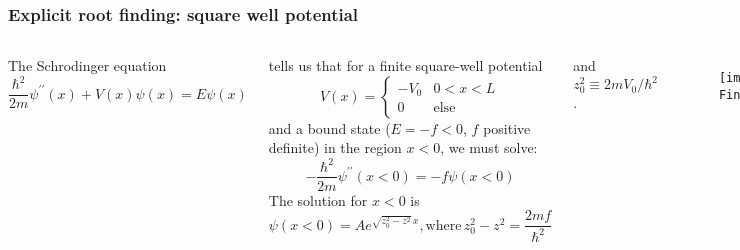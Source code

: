 \documentclass[hyperref={colorlinks=true}]{beamer}
\begin{document}
\begin{frame}[shrink=20]
  \frametitle{Explicit root finding: square well potential}

  \begin{columns}
  
    
  The Schrodinger equation  
  \begin{equation}
    \frac{\hbar^2}{2m}\psi^{\prime\prime}(x) + V(x)\psi(x) = E\psi(x)
  \end{equation}
  
  tells us that for a finite square-well potential
  \begin{equation}
    V(x) = \begin{cases}  
             -V_0 & 0 < x < L \\
             0    & \mathrm{else}
           \end{cases}
  \end{equation}
  and a bound state ($E=-f<0$, $f$ positive definite) in the region $x<0$, we must solve:
  \begin{equation}
    -\frac{\hbar^2}{2m}\psi^{\prime\prime}(x<0) = -f\psi(x<0)
  \end{equation}
  The solution for $x<0$ is
  \begin{equation}
    \psi(x<0) = A e^{\sqrt{z_0^2 - z^2}\, x}, \mathrm{where} \, z_0^2 - z^2 = \frac{2mf}{\hbar^2}
  \end{equation}
  
  and $z_0^2 \equiv 2mV_0/\hbar^2$.
  
  
  \vspace{-0.5cm}
  
  \begin{figure}
    \texttt{[image: Finite\_Square\_Potential\_Well.png]}
  \end{figure}

  In order to solve for the bound-state energies, we need to solve the following
  \begin{equation}
    \tan(za) = \frac{2 \sqrt{ \left( \frac{z_0}{z} \right)^2 - 1 } }{ 2 - \left( \frac{z_0}{z} \right)^2 }
  \end{equation}
  
  This is transcendental, requires numerical approaches to finding the  of
  \begin{equation}
    F(z) = \tan(za) - \frac{2 \sqrt{ \left( \frac{z_0}{z} \right)^2 - 1 } }{ 2 - \left( \frac{z_0}{z} \right)^2 }
  \end{equation}
  
  
  
  \end{columns}

\end{frame}
\end{document}
